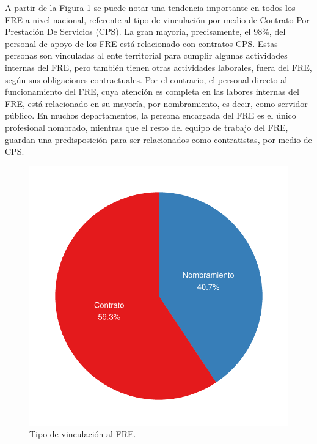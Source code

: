 \documentclass[
]{book}
\begin{document}
A partir de la Figura \ref{fig:pieProfesional2} se puede notar una tendencia importante en todos los FRE a nivel nacional, referente al tipo de vinculación por medio de Contrato Por Prestación De Servicios (CPS). La gran mayoría, precisamente, el 98\%, del personal de apoyo de los FRE está relacionado con contratos CPS. Estas personas son vinculadas al ente territorial para cumplir algunas actividades internas del FRE, pero también tienen otras actividades laborales, fuera del FRE, según sus obligaciones contractuales. Por el contrario, el personal directo al funcionamiento del FRE, cuya atención es completa en las labores internas del FRE, está relacionado en su mayoría, por nombramiento, es decir, como servidor público. En muchos departamentos, la persona encargada del FRE es el único profesional nombrado, mientras que el resto del equipo de trabajo del FRE, guardan una predisposición para ser relacionados como contratistas, por medio de CPS.

\begin{figure}[t]

{\centering \includegraphics[width=0.85\linewidth]{InformeFinal_files/figure-latex/pieProfesional2-1} 

}

\caption{Tipo de vinculación al FRE.}\label{fig:pieProfesional2}
\end{figure}
\end{document}
